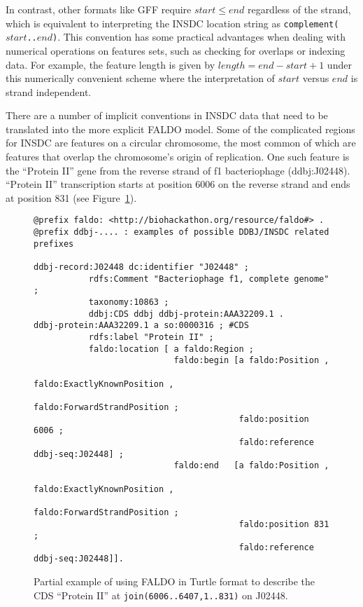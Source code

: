 In contrast, other formats like GFF require $start \leq end$
regardless of the strand, which is equivalent to interpreting
the INSDC location string as \texttt{complement($start$..$end$)}.
This convention has some practical advantages when
dealing with numerical operations on features sets, such as
checking for overlaps or indexing data. For example, the
feature length is given by $length = end - start + 1$ under
this numerically convenient scheme where the interpretation
of $start$ versus $end$ is strand independent.

There are a number of implicit conventions in INSDC data that need to be translated into the more explicit FALDO model.
Some of the complicated regions for INSDC are features on a circular chromosome, the most common of which are features that overlap the chromosome's origin of replication.
One such feature is the ``Protein II'' gene from the reverse strand of f1 bacteriophage (ddbj:J02448).
``Protein II'' transcription starts at position 6006 on the reverse strand and ends at position 831 (see Figure~\ref{fig:insdcReverseOverOrigin}).


\begin{figure}
\begin{shaded}
\small
\begin{verbatim}
@prefix faldo: <http://biohackathon.org/resource/faldo#> .
@prefix ddbj-.... : examples of possible DDBJ/INSDC related prefixes

ddbj-record:J02448 dc:identifier "J02448" ;
           rdfs:Comment "Bacteriophage f1, complete genome" ;
           taxonomy:10863 ;
           ddbj:CDS ddbj ddbj-protein:AAA32209.1 .
ddbj-protein:AAA32209.1 a so:0000316 ; #CDS
           rdfs:label "Protein II" ;
           faldo:location [ a faldo:Region ;
                            faldo:begin [a faldo:Position ,
                                           faldo:ExactlyKnownPosition ,
                                           faldo:ForwardStrandPosition ;
                                         faldo:position 6006 ;
                                         faldo:reference ddbj-seq:J02448] ;
                            faldo:end   [a faldo:Position , 
                                           faldo:ExactlyKnownPosition ,
                                           faldo:ForwardStrandPosition ;
                                         faldo:position 831 ;
                                         faldo:reference ddbj-seq:J02448]].
\end{verbatim}
\end{shaded}
\caption{Partial example of using FALDO in Turtle format to describe
the CDS ``Protein II'' at \texttt{join(6006..6407,1..831)} on J02448.}
\label{fig:insdcReverseOverOrigin}
\end{figure}


